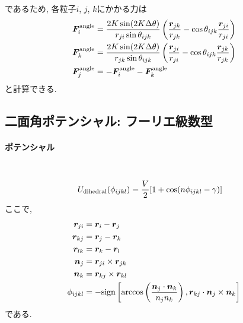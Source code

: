 であるため, 各粒子$i$, $j$, $k$にかかる力は
\begin{align}
   \bm{F}_{i}^{\mathrm{angle}}
   &=
   \frac{2K \sin (2K \Delta \theta)}{r_{ji} \sin\theta_{ijk}}
   \left(
            \frac{\bm{r}_{jk}}{r_{jk}}
          - \cos\theta_{ijk} \frac{\bm{r}_{ji}}{r_{ji}}
   \right)
   \notag \\
   \bm{F}_{k}^{\mathrm{angle}}
   &=
   \frac{2K \sin (2K \Delta \theta)}{r_{jk} \sin\theta_{ijk}}
   \left(
           \frac{\bm{r}_{ji}}{r_{ji}}
         - \cos\theta_{ijk} \frac{\bm{r}_{jk}}{r_{jk}}
   \right)
   \notag \\
   \bm{F}_{j}^{\mathrm{angle}}
   &=
   - \bm{F}_{i}^{\mathrm{angle}} - \bm{F}_{k}^{\mathrm{angle}}
   \notag
\end{align}
と計算できる.

\clearpage
\subsection{二面角ポテンシャル: フーリエ級数型}
\paragraph{ポテンシャル} \
\begin{alignat}{1}
   U_{\mathrm{dihedral}}(\phi_{ijkl})
  &=
  \frac{V}{2} [1 + \cos(n\phi_{ijkl} - \gamma)]
  \notag
\end{alignat}
ここで, 
\begin{alignat}{1}
 \bm{r}_{ji} &= \bm{r}_{i} - \bm{r}_{j}
 \notag \\
 \bm{r}_{kj} &= \bm{r}_{j} - \bm{r}_{k}
 \notag \\
 \bm{r}_{lk} &= \bm{r}_{k} - \bm{r}_{l}
 \notag \\
 \bm{n}_{j}  &= \bm{r}_{ji} \times \bm{r}_{jk}
 \notag \\
 \bm{n}_{k}  &= \bm{r}_{kj} \times \bm{r}_{kl}
 \notag
 \\
 \phi_{ijkl} &=
 - \mathrm{sign}
   \left[
         \arccos \left( \frac{\bm{n}_{j} \cdot \bm{n}_{k}}{n_{j} n_{k}}\right),
         \bm{r}_{kj} \cdot \bm{n}_{j} \times \bm{n}_{k}
   \right]
 \notag
\end{alignat}
である. 

